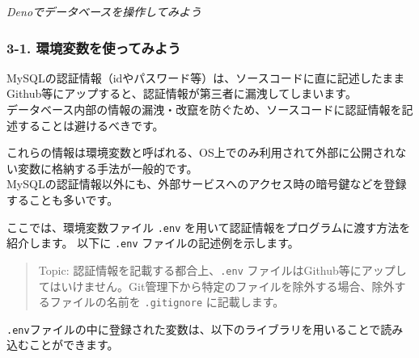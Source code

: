 \emph{Denoでデータベースを操作してみよう}

\subsubsection{3-1.
環境変数を使ってみよう}\label{ux74b0ux5883ux5909ux6570ux3092ux4f7fux3063ux3066ux307fux3088ux3046}

MySQLの認証情報（idやパスワード等）は、ソースコードに直に記述したままGithub等にアップすると、認証情報が第三者に漏洩してしまいます。\\
データベース内部の情報の漏洩・改竄を防ぐため、ソースコードに認証情報を記述することは避けるべきです。

これらの情報は環境変数と呼ばれる、OS上でのみ利用されて外部に公開されない変数に格納する手法が一般的です。\\
MySQLの認証情報以外にも、外部サービスへのアクセス時の暗号鍵などを登録することも多いです。

ここでは、環境変数ファイル \texttt{.env}
を用いて認証情報をプログラムに渡す方法を紹介します。 以下に
\texttt{.env} ファイルの記述例を示します。

\begin{quote}
Topic: 認証情報を記載する都合上、\texttt{.env}
ファイルはGithub等にアップしてはいけません。Git管理下から特定のファイルを除外する場合、除外するファイルの名前を
\texttt{.gitignore} に記載します。
\end{quote}

\begin{Shaded}
\begin{Highlighting}[]
\end{Highlighting}
\end{Shaded}

\texttt{.env}ファイルの中に登録された変数は、以下のライブラリを用いることで読み込むことができます。

\begin{Shaded}
\begin{Highlighting}[]
 

\NormalTok{(}\NormalTok{))}
\end{Highlighting}
\end{Shaded}

